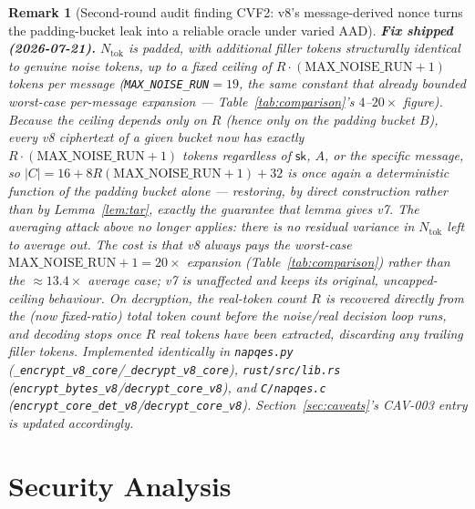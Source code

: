 \documentclass[11pt,a4paper]{article}
\newtheorem{remark}[theorem]{Remark}
\begin{document}
\begin{remark}[Second-round audit finding CVF2: v8's message-derived nonce turns the padding-bucket leak into a reliable oracle under varied AAD]
\textbf{Fix shipped (2026-07-21).} $N_{\mathrm{tok}}$ is padded, with
additional filler tokens structurally identical to genuine noise tokens,
up to a fixed ceiling of $R\cdot(\mathrm{MAX\_NOISE\_RUN}+1)$ tokens per
message (\texttt{MAX\_NOISE\_RUN}$=19$, the same constant that already
bounded worst-case per-message expansion --- Table~\ref{tab:comparison}'s
$4$--$20\times$ figure). Because the ceiling depends only on $R$ (hence
only on the padding bucket $B$), every v8 ciphertext of a given bucket now
has \emph{exactly} $R\cdot(\mathrm{MAX\_NOISE\_RUN}+1)$ tokens regardless
of $\mathsf{sk}$, $A$, or the specific message, so
$|C|=16+8R(\mathrm{MAX\_NOISE\_RUN}+1)+32$ is once again a deterministic
function of the padding bucket alone --- restoring, by direct
construction rather than by Lemma~\ref{lem:tar}, exactly the guarantee
that lemma gives v7. The averaging attack above no longer applies: there
is no residual variance in $N_{\mathrm{tok}}$ left to average out. The
cost is that v8 always pays the worst-case $\mathrm{MAX\_NOISE\_RUN}+1=20\times$
expansion (Table~\ref{tab:comparison}) rather than the $\approx 13.4\times$
average case; v7 is unaffected and keeps its original, uncapped-ceiling
behaviour. On decryption, the real-token count $R$ is recovered directly
from the (now fixed-ratio) total token count before the noise/real
decision loop runs, and decoding stops once $R$ real tokens have been
extracted, discarding any trailing filler tokens.
Implemented identically in \texttt{napqes.py}
(\texttt{\_encrypt\_v8\_core}/\texttt{\_decrypt\_v8\_core}),
\texttt{rust/src/lib.rs} (\texttt{encrypt\_bytes\_v8}/\texttt{decrypt\_core\_v8}),
and \texttt{C/napqes.c} (\texttt{encrypt\_core\_det\_v8}/\texttt{decrypt\_core\_v8}).
Section~\ref{sec:caveats}'s CAV-003 entry is updated accordingly.
\end{remark}

\section{Security Analysis}
\label{sec:security}
\end{document}
